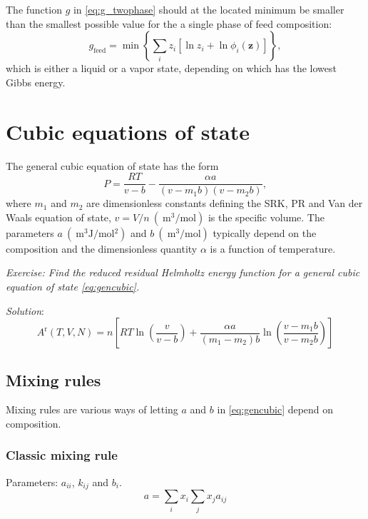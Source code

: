 \documentclass[internal,english]{sintefmemo2012}
\newcommand*{\vektor}[1]{\boldsymbol{#1}}%
\begin{document}
The function $g$ in \eqref{eq:g_twophase} should at the located minimum be smaller than the smallest possible value 
for the a single phase of feed composition:
\begin{equation}
  g_\text{feed} = \min\left\{ \sum_i  z_i \left[ \ln z_i + \ln \phi_i(\vektor{z}) \right]   \right\},
  \label{}
\end{equation}
which is either a liquid or a vapor state, depending on which has the lowest Gibbs energy.


\section{Cubic equations of state}
The general cubic equation of state has the form
\begin{equation}
P = \frac{RT}{v -b}- \frac{\alpha a}{(v-m_1 b)(v-m_2 b)},
\label{eq:gencubic}
\end{equation}
where $m_1$ and $m_2$ are dimensionless constants defining the SRK, PR and Van der
Waals equation of state, $v=V/n~(\SI{}{\meter^3\per\mol})$ is the specific volume. The
parameters $a~(\SI{}{\meter^3\joule\per \mol^2})$ and $b~(\SI{}{\meter^3\per\mol})$ typically 
depend on the composition and the dimensionless quantity 
$\alpha$ is a function of temperature. 



\begin{shaded}
  \noindent
\textit{Exercise: Find the reduced residual Helmholtz energy function for a general
cubic equation of state \eqref{eq:gencubic}.}

\noindent
\textit{Solution}:
\begin{equation}
  A^\text{r}(T,V,N) = n \left[ RT\ln \left( \frac{v}{v-b} \right) + 
  \frac{\alpha a}{\left( m_1-m_2 \right)b} \ln\left( \frac{v-m_1 b}{v-m_2 b} \right) \right]
  \label{}
\end{equation}

\end{shaded}

\subsection{Mixing rules}
Mixing rules are various ways of letting $a$ and $b$ in \eqref{eq:gencubic} 
depend on composition. 

\subsubsection{Classic mixing rule}
Parameters: $a_{ii}$, $k_{ij}$ and $b_i$.
\begin{equation}
  a = \sum_i x_i \sum_j x_j a_{ij}
  \label{}
\end{equation}
\end{document}
